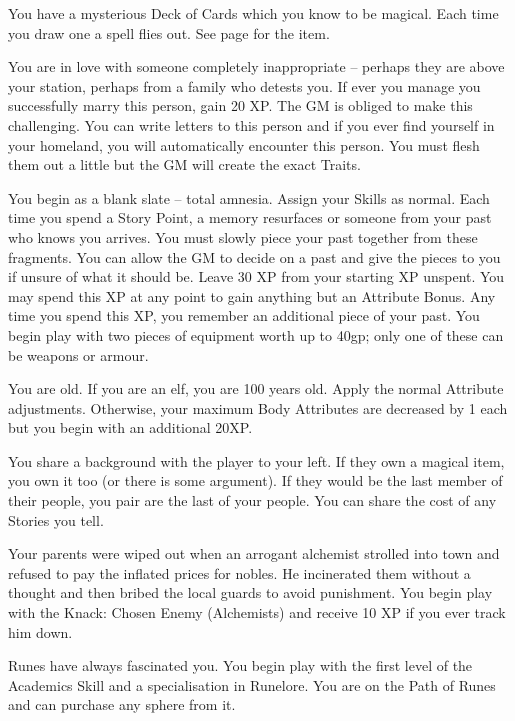 \begin{multicols}{2}
\begin{list}{\addtocounter{list}{1}\textbf{:}}{\raggedleft}
	\item
	You have a mysterious Deck of Cards which you know to be magical.
	Each time you draw one a spell flies out.
	See page \pageref{deckofmanythings} for the item.

	\item
	You are in love with someone completely inappropriate -- perhaps they are above your station, perhaps from a family who detests you.
	If ever you manage you successfully marry this person, gain 20 XP.
	The GM is obliged to make this challenging.
	You can write letters to this person and if you ever find yourself in your homeland, you will automatically encounter this person.
	You must flesh them out a little but the GM will create the exact Traits.

	\item
	You begin as a blank slate -- total amnesia.
	Assign your Skills as normal.
	Each time you spend a Story Point, a memory resurfaces or someone from your past who knows you arrives.
	You must slowly piece your past together from these fragments.
	You can allow the GM to decide on a past and give the pieces to you if unsure of what it should be.
	Leave 30 XP from your starting XP unspent.
	You may spend this XP at any point to gain anything but an Attribute Bonus.
	Any time you spend this XP, you remember an additional piece of your past.
	You begin play with two pieces of equipment worth up to 40gp; only one of these can be weapons or armour.

	\item
	You are old.
	If you are an elf, you are 100 years old.
	Apply the normal Attribute adjustments.
	Otherwise, your maximum Body Attributes are decreased by 1 each but you begin with an additional 20XP.

	\item
	You share a background with the player to your left.
	If they own a magical item, you own it too (or there is some argument).
	If they would be the last member of their people, you pair are the last of your people.
	You can share the cost of any Stories you tell.

	\item
	Your parents were wiped out when an arrogant alchemist strolled into town and refused to pay the inflated prices for nobles.
	He incinerated them without a thought and then bribed the local guards to avoid punishment.
	You begin play with the Knack: Chosen Enemy (Alchemists) and receive 10 XP if you ever track him down.

	\item
	Runes have always fascinated you.
	You begin play with the first level of the Academics Skill and a specialisation in Runelore.
	You are on the Path of Runes and can purchase any sphere from it.


\end{list}
\end{multicols}
